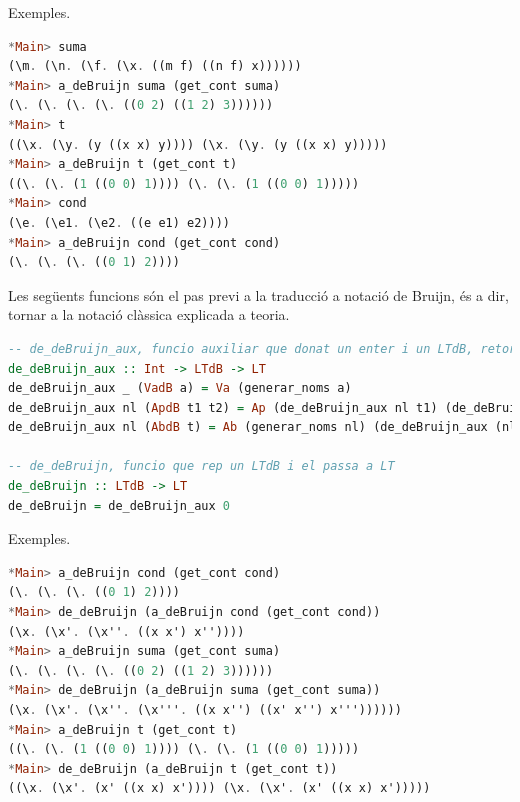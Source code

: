 \documentclass[10pt,a4paper]{article}
\begin{document}
Exemples.

\begin{lstlisting}[language=Haskell]
*Main> suma
(\m. (\n. (\f. (\x. ((m f) ((n f) x))))))
*Main> a_deBruijn suma (get_cont suma)
(\. (\. (\. (\. ((0 2) ((1 2) 3))))))
*Main> t
((\x. (\y. (y ((x x) y)))) (\x. (\y. (y ((x x) y)))))
*Main> a_deBruijn t (get_cont t)
((\. (\. (1 ((0 0) 1)))) (\. (\. (1 ((0 0) 1)))))
*Main> cond
(\e. (\e1. (\e2. ((e e1) e2))))
*Main> a_deBruijn cond (get_cont cond)
(\. (\. (\. ((0 1) 2))))
\end{lstlisting}

Les següents funcions són el pas previ a la traducció a notació de Bruijn, és a dir, tornar a la notació clàssica explicada a teoria.

\begin{lstlisting}[language=Haskell]
-- de_deBruijn_aux, funcio auxiliar que donat un enter i un LTdB, retorna el LTdB convertit a LT, el enter es per controlar els noms de les variables
de_deBruijn_aux :: Int -> LTdB -> LT
de_deBruijn_aux _ (VadB a) = Va (generar_noms a)
de_deBruijn_aux nl (ApdB t1 t2) = Ap (de_deBruijn_aux nl t1) (de_deBruijn_aux nl t2)
de_deBruijn_aux nl (AbdB t) = Ab (generar_noms nl) (de_deBruijn_aux (nl+1) t)

-- de_deBruijn, funcio que rep un LTdB i el passa a LT
de_deBruijn :: LTdB -> LT
de_deBruijn = de_deBruijn_aux 0
\end{lstlisting}

Exemples.

\begin{lstlisting}[language=Haskell]
*Main> a_deBruijn cond (get_cont cond)
(\. (\. (\. ((0 1) 2))))
*Main> de_deBruijn (a_deBruijn cond (get_cont cond))
(\x. (\x'. (\x''. ((x x') x''))))
*Main> a_deBruijn suma (get_cont suma)
(\. (\. (\. (\. ((0 2) ((1 2) 3))))))
*Main> de_deBruijn (a_deBruijn suma (get_cont suma))
(\x. (\x'. (\x''. (\x'''. ((x x'') ((x' x'') x'''))))))
*Main> a_deBruijn t (get_cont t)
((\. (\. (1 ((0 0) 1)))) (\. (\. (1 ((0 0) 1)))))
*Main> de_deBruijn (a_deBruijn t (get_cont t))
((\x. (\x'. (x' ((x x) x')))) (\x. (\x'. (x' ((x x) x')))))
\end{lstlisting}
\end{document}
